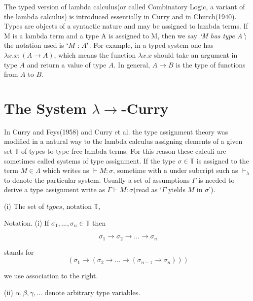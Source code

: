 The typed version of lambda calculus(or called Combinatory Logic, a variant of the lambda calculus) is introduced essentially in Curry\cite{curry1934functionality} and in Church(1940). Types are objects of a syntactic nature and may be assigned to lambda terms. If M is a lambda term and a type A is assigned to M, then we say \textit{`M has type A'}; the notation used is $`M:A'$. For example, in a typed system one has $\lambda x.x : (A \rightarrow A)$, which means the function $\lambda x.x$ should take an argument in type $A$ and return a value of type $A$. In general, $A \rightarrow B$ is the type of functions from $A$ to $B$.

\section{The System $\lambda \rightarrow $-Curry}

In Curry and Feys(1958) and Curry et al. the type assignment theory was modified in a natural way to the lambda calculus assigning elements of a given set $\mathbb{T}$ of types to type free lambda terms. For this reason these calculi are sometimes called systems of type assignment. If the type $\sigma \in \mathbb{T}$ is assigned to the term $M \in \Lambda$ which writes as $\vdash M : \sigma$, sometime with a under subcript such as $\vdash _\lambda$ to denote the particular system. Usually a set of assumptions $\Gamma$ is needed to derive a type assignment write as $\Gamma \vdash M : \sigma$(read as `$\Gamma$ yields $M$ in $\sigma$').

\begin{def1}
\normalfont (i) The set of $types$, notation $\mathbb{T}$, 
\end{def1} 

Notation. (i) If $\sigma _1,...,\sigma _n \in \mathbb{T}$ then

\begin{equation*}
\sigma _1 \rightarrow \sigma _2 \rightarrow ... \rightarrow \sigma _n
\end{equation*}

\noindent stands for
\begin{equation*}
(\sigma _1 \rightarrow (\sigma _2 \rightarrow ... \rightarrow (\sigma _{n-1} \rightarrow \sigma _n)))
\end{equation*}

\noindent we use association to the right.

     (ii) $\alpha,\beta,\gamma,...$ denote arbitrary type variables.


